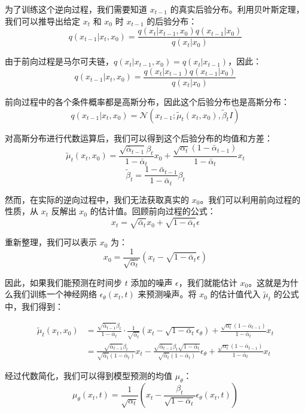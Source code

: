 \documentclass{ctexart}
\begin{document}
\noindent
为了训练这个逆向过程，我们需要知道 $x_{t-1}$ 的真实后验分布。利用贝叶斯定理，我们可以推导出给定 $x_t$ 和 $x_0$ 时 $x_{t-1}$ 的后验分布：
$$ q(x_{t-1} | x_t, x_0) = \frac{q(x_t | x_{t-1}, x_0) q(x_{t-1} | x_0)}{q(x_t | x_0)} $$

\noindent
由于前向过程是马尔可夫链，$q(x_t | x_{t-1}, x_0) = q(x_t | x_{t-1})$，因此：
$$ q(x_{t-1} | x_t, x_0) = \frac{q(x_t | x_{t-1}) q(x_{t-1} | x_0)}{q(x_t | x_0)} $$

\noindent
前向过程中的各个条件概率都是高斯分布，因此这个后验分布也是高斯分布：
$$ q(x_{t-1} | x_t, x_0) = \mathcal{N}(x_{t-1}; \tilde{\mu}_t(x_t, x_0), \tilde{\beta}_t I) $$

\noindent
对高斯分布进行代数运算后，我们可以得到这个后验分布的均值和方差：
$$ \tilde{\mu}_t(x_t, x_0) = \frac{\sqrt{\bar{\alpha}_{t-1}}\beta_t}{1-\bar{\alpha}_t}x_0 + \frac{\sqrt{\alpha_t}(1-\bar{\alpha}_{t-1})}{1-\bar{\alpha}_t}x_t $$
$$ \tilde{\beta}_t = \frac{1-\bar{\alpha}_{t-1}}{1-\bar{\alpha}_t}\beta_t $$

\noindent
然而，在实际的逆向过程中，我们无法获取真实的 $x_0$。我们可以利用前向过程的性质，从 $x_t$ 反解出 $x_0$ 的估计值。回顾前向过程的公式：
$$ x_t = \sqrt{\bar{\alpha}_t}x_0 + \sqrt{1 - \bar{\alpha}_t}\epsilon $$

\noindent
重新整理，我们可以表示 $x_0$ 为：
$$ x_0 = \frac{1}{\sqrt{\bar{\alpha}_t}}(x_t - \sqrt{1-\bar{\alpha}_t}\epsilon) $$

\noindent
因此，如果我们能预测在时间步 $t$ 添加的噪声 $\epsilon$，我们就能估计 $x_0$。这就是为什么我们训练一个神经网络 $\epsilon_\theta(x_t, t)$ 来预测噪声。将 $x_0$ 的估计值代入 $\tilde{\mu}_t$ 的公式中，我们得到：

\begin{align*}
\tilde{\mu}_t(x_t, x_0) &= \frac{\sqrt{\bar{\alpha}_{t-1}}\beta_t}{1-\bar{\alpha}_t} \cdot \frac{1}{\sqrt{\bar{\alpha}_t}}(x_t - \sqrt{1-\bar{\alpha}_t}\epsilon_\theta) + \frac{\sqrt{\alpha_t}(1-\bar{\alpha}_{t-1})}{1-\bar{\alpha}_t}x_t \\
&= \frac{\sqrt{\bar{\alpha}_{t-1}}\beta_t}{\sqrt{\bar{\alpha}_t}(1-\bar{\alpha}_t)}x_t - \frac{\sqrt{\bar{\alpha}_{t-1}}\beta_t\sqrt{1-\bar{\alpha}_t}}{\sqrt{\bar{\alpha}_t}(1-\bar{\alpha}_t)}\epsilon_\theta + \frac{\sqrt{\alpha_t}(1-\bar{\alpha}_{t-1})}{1-\bar{\alpha}_t}x_t
\end{align*}

\noindent
经过代数简化，我们可以得到模型预测的均值 $\mu_\theta$：
$$ \mu_\theta(x_t, t) = \frac{1}{\sqrt{\alpha_t}}\left(x_t - \frac{\beta_t}{\sqrt{1-\bar{\alpha}_t}}\epsilon_\theta(x_t, t)\right) $$
\end{document}
